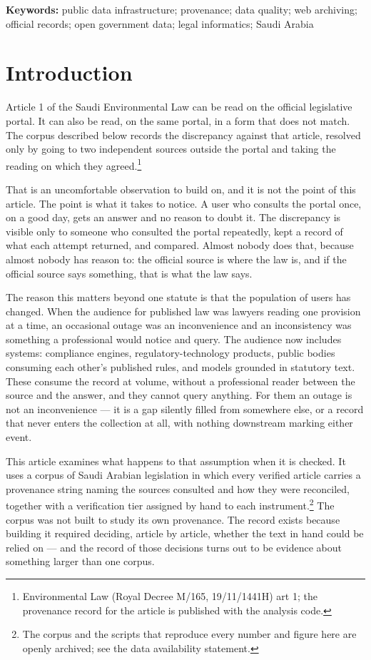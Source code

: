 \documentclass[11pt]{article}
\begin{document}
\vspace{1em}\noindent\textbf{Keywords:} public data infrastructure;
provenance; data quality; web archiving; official records; open government
data; legal informatics; Saudi Arabia
\vspace{1.5em}

\section{Introduction}

Article 1 of the Saudi Environmental Law can be read on the official
legislative portal. It can also be read, on the same portal, in a form that
does not match. The corpus described below records the discrepancy against
that article, resolved only by going to two independent sources outside the
portal and taking the reading on which they agreed.\footnote{Environmental Law
(Royal Decree M/165, 19/11/1441H) art 1; the provenance record for the article
is published with the analysis code.}

That is an uncomfortable observation to build on, and it is not the point of
this article. The point is what it takes to notice. A user who consults the
portal once, on a good day, gets an answer and no reason to doubt it. The
discrepancy is visible only to someone who consulted the portal repeatedly, kept
a record of what each attempt returned, and compared. Almost nobody does that,
because almost nobody has reason to: the official source is where the law is,
and if the official source says something, that is what the law says.

The reason this matters beyond one statute is that the population of users has
changed. When the audience for published law was lawyers reading one provision
at a time, an occasional outage was an inconvenience and an inconsistency was
something a professional would notice and query. The audience now includes
systems: compliance engines, regulatory-technology products, public bodies
consuming each other's published rules, and models grounded in statutory text.
These consume the record at volume, without a professional reader between the
source and the answer, and they cannot query anything. For them an outage is
not an inconvenience --- it is a gap silently filled from somewhere else, or a
record that never enters the collection at all, with nothing downstream marking
either event.

This article examines what happens to that assumption when it is checked. It
uses a corpus of Saudi Arabian legislation in which every verified article
carries a provenance string naming the sources consulted and how they were
reconciled, together with a verification tier assigned by hand to each
instrument.\footnote{The corpus and the scripts that reproduce every number and
figure here are openly archived; see the data availability statement.} The
corpus was not built to study its own provenance. The record exists because
building it required deciding, article by article, whether the text in hand
could be relied on --- and the record of those decisions turns out to be
evidence about something larger than one corpus.
\end{document}
